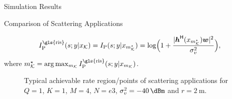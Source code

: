 \documentclass[journal]{IEEEtran}
\begin{document}
\begin{section}{Simulation Results}
\begin{subsection}{Comparison of Scattering Applications}
\begin{itemize}
\begin{equation}
				I_{\text{P}}^{\text{\gls{ris}}}(s;y|x_{\mathcal{K}}) = I_{\text{P}}(s;y|x_{m_{\mathcal{K}}^{\star}}) = \log \Bigl(1 + \frac{\lvert \boldsymbol{h}^\mathsf{H}(x_{m_{\mathcal{K}}^{\star}}) \boldsymbol{w} \rvert^2}{\sigma_v^2}\Bigr),
			\end{equation}
			where $m_{\mathcal{K}}^{\star} = \arg \max_{m_{\mathcal{K}}} I_{\text{P}}^{\text{\gls{ris}}}(s;y|x_{m_{\mathcal{K}}})$.
		\end{itemize}
		\begin{figure}[!t]
			\centering
			\resizebox{0.65\columnwidth}{!}{
				
			}
			\caption{Typical achievable rate region/points of scattering applications for $Q=1$, $K=1$, $M=4$, $N=e3$, $\sigma_v^2=\qty{-40}{\dBm}$ and $r=\qty{2}{\meter}$.}
			\label{fg:region_comparison}
		\end{figure}


\end{subsection}
\end{section}
\end{document}
